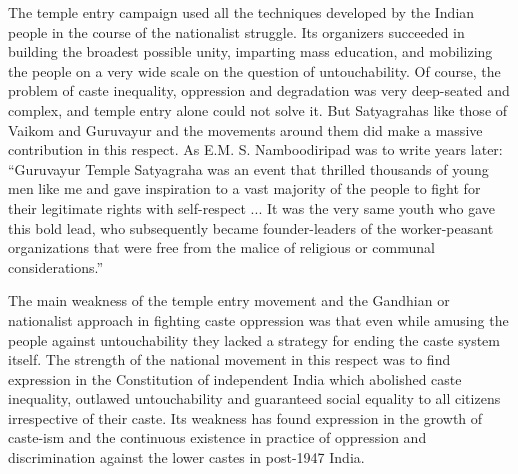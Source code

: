 \begin{multicols}{2}
The temple entry campaign used all the techniques developed by the Indian people in the course of the nationalist struggle. Its organizers succeeded in building the broadest possible unity, imparting mass education, and mobilizing the people on a very wide scale on the question of untouchability. Of course, the problem of caste inequality, oppression and degradation was very deep-seated and complex, and temple entry alone could not solve it. But Satyagrahas like those of Vaikom and Guruvayur and the movements around them did make a massive contribution in this respect. As E.M. S. Namboodiripad was to write years later: ``Guruvayur Temple Satyagraha was an event that thrilled thousands of young men like me and gave inspiration to a vast majority of the people to fight for their legitimate rights with self-respect ... It was the very same youth who gave this bold lead, who subsequently became founder-leaders of the worker-peasant organizations that were free from the malice of religious or communal considerations.''

The main weakness of the temple entry movement and the Gandhian or nationalist approach in fighting caste oppression was that even while amusing the people against untouchability they lacked a strategy for ending the caste system itself. The strength of the national movement in this respect was to find expression in the Constitution of independent India which abolished caste inequality, outlawed untouchability and guaranteed social equality to all citizens irrespective of their caste. Its weakness has found expression in the growth of caste-ism and the continuous existence in practice of oppression and discrimination against the lower castes in post-1947 India.

\end{multicols}
